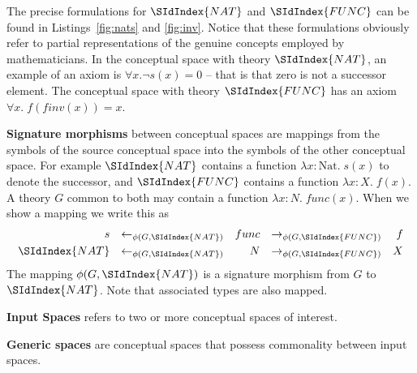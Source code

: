 The precise formulations for $\SIdIndex{NAT}$ and $ \SIdIndex{FUNC}$ can
be found in Listings~\ref{fig:nats} and \ref{fig:inv}. 
Notice that these formulations obviously refer to 
partial representations of the genuine concepts
employed by mathematicians.  
In the conceptual space with theory $\SIdIndex{NAT}$, an example of an axiom is 
$\forall x. \neg s(x) = 0$ -- that is that zero is not a successor element.
The conceptual space with theory $\SIdIndex{FUNC}$ has an axiom
$\forall x.\;f(finv(x)) = x$. 

{\bf Signature morphisms} between conceptual spaces are mappings from
the symbols of the source conceptual space into the symbols of the other
conceptual space. For example $\SIdIndex{NAT}$ contains a function $\lambda
x:\textrm{Nat}.\;s(x)$ to denote the successor, and $\SIdIndex{FUNC}$ contains a function
$\lambda x:X.\;f(x)$. 
A theory $G$ common to both may contain a function
$\lambda x:N.\;func(x)$. 
When we show a mapping%
we write 
this as
\begin{align}
s&&\leftarrow_{\phi(G,\SIdIndex{NAT})}&&func&&\rightarrow_{\phi(G,\SIdIndex{FUNC})}&&f\\
\SIdIndex{NAT}&&\leftarrow_{\phi(G,\SIdIndex{NAT})}&&N&&\rightarrow_{\phi(G,\SIdIndex{FUNC})}&&X
\end{align}
\noindent The mapping $\phi(G,\SIdIndex{NAT})$ is a signature morphism from
$G$ to $\SIdIndex{NAT}$. Note that associated types are also mapped.

{\bf Input Spaces} refers to two or more conceptual spaces of
interest. 

{\bf Generic spaces} are conceptual spaces that possess commonality
between input spaces. 


